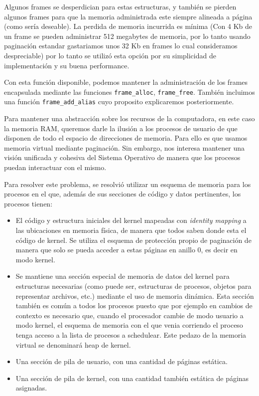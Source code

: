 Algunos frames se desperdician para estas estructuras, y tambi\'en se pierden algunos frames para que la memoria administrada
este siempre alineada a p\'agina (como ser\'ia deseable). La perdida de memoria incurrida es m\'inima (Con 4 Kb de un frame se
pueden administrar 512 megabytes de memoria, por lo tanto usando paginaci\'on estandar gastariamos unos 32 Kb en frames lo cual
consideramos despreciable) por lo tanto se utiliz\'o esta opci\'on por su simplicidad de implementaci\'on y su buena performance.

Con esta funci\'on disponible, podemos mantener la administraci\'on de los frames encapsulada mediante las funciones \texttt{frame\_alloc},
\texttt{frame\_free}. Tambi\'en incluimos una funci\'on \texttt{frame\_add\_alias} cuyo proposito explicaremos posteriormente.

Para mantener una abstracci\'on sobre los recursos de la computadora, en este caso la memoria RAM, queremos darle la ilusi\'on a los
procesos de usuario de que disponen de todo el espacio de direcciones de memoria. Para ello es que usamos memoria virtual mediante paginaci\'on.
Sin embargo, nos interesa mantener una visi\'on unificada y cohesiva del Sistema Operativo de manera que los procesos puedan interactuar con
el mismo.

Para resolver este problema, se resolvi\'o utilizar un esquema de memoria para los procesos en el que, adem\'as de sus secciones de c\'odigo
y datos pertinentes, los procesos tienen:

\begin{itemize}
	\item El c\'odigo y estructura iniciales del kernel mapeadas con \textit{identity mapping} a las ubicaciones en memoria f\'isica, de
	manera que todos saben donde esta el c\'odigo de kernel. Se utiliza el esquema de protecci\'on propio de paginaci\'on de manera que
	solo se pueda acceder a estas p\'aginas en anillo 0, es decir en modo kernel.
	\item Se mantiene una secci\'on especial de memoria de datos del kernel para estructuras necesarias (como puede ser, estructuras de
	procesos, objetos para representar archivos, etc.) mediante el uso de memoria din\'amica. Esta secci\'on tambi\'en es com\'un a todos
	los procesos puesto que por ejemplo en cambios de contexto es necesario que, cuando el procesador cambie de modo usuario a modo kernel,
	el esquema de memoria con el que venia corriendo el proceso tenga acceso a la lista de procesos a schedulear. Este pedazo de la memoria
	virtual se denominar\'a heap de kernel.
	\item Una secci\'on de pila de usuario, con una cantidad de p\'aginas est\'atica.
	\item Una secci\'on de pila de kernel, con una cantidad tambi\'en est\'atica de p\'aginas asignadas.
\end{itemize}

